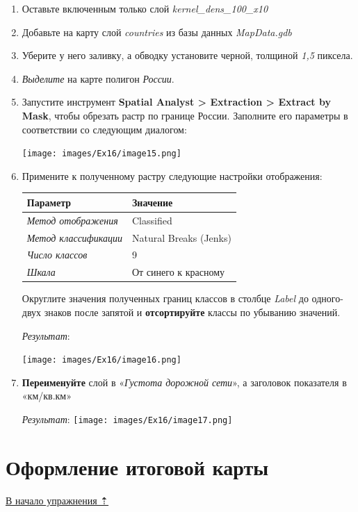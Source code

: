 \documentclass[12pt,]{book}
\begin{document}
\begin{enumerate}
\def\labelenumi{\arabic{enumi}.}
\item
  Оставьте включенным только слой \emph{kernel\_dens\_100\_x10}
\item
  Добавьте на карту слой \emph{countries} из базы данных \emph{MapData.gdb}
\item
  Уберите у него заливку, а обводку установите черной, толщиной \emph{1,5} пиксела.
\item
  \emph{Выделите} на карте полигон \emph{России}.
\item
  Запустите инструмент \textbf{Spatial Analyst \textgreater{} Extraction \textgreater{} Extract by Mask}, чтобы обрезать растр по границе России. Заполните его параметры в соответствии со следующим диалогом:

  \texttt{[image: images/Ex16/image15.png]}
\item
  Примените к полученному растру следующие настройки отображения:

  \begin{longtable}[]{@{}ll@{}}
  \toprule
  Параметр & Значение\tabularnewline
  \midrule
  \endhead
  \emph{Метод отображения} & Classified\tabularnewline
  \emph{Метод классификации} & Natural Breaks (Jenks)\tabularnewline
  \emph{Число классов} & 9\tabularnewline
  \emph{Шкала} & От синего к красному\tabularnewline
  \bottomrule
  \end{longtable}

  Округлите значения полученных границ классов в столбце \emph{Label} до одного-двух знаков после запятой и \textbf{отсортируйте} классы по убыванию значений.

  \emph{Результат}:

  \texttt{[image: images/Ex16/image16.png]}
\item
  \textbf{Переименуйте} слой в «\emph{Густота дорожной сети}», а заголовок показателя в «км/кв.км»

  \emph{Результат}:
  \texttt{[image: images/Ex16/image17.png]}
\end{enumerate}

\hypertarget{density-analysis-design}{%
\section{Оформление итоговой карты}\label{density-analysis-design}}

\protect\hyperlink{density-analysis}{В начало упражнения ⇡}
\end{document}
